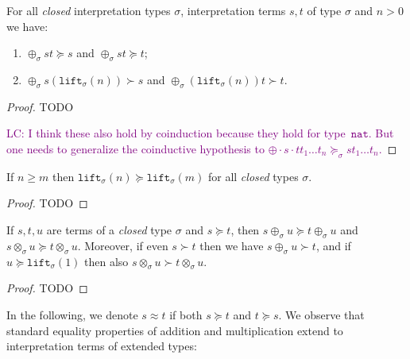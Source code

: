 \documentclass[runningheads,a4paper]{llncs}
\newcommand{\app}[2]{#1 \cdot #2}
\newcommand{\nat}{\mathtt{nat}}
\newcommand{\lift}{\mathtt{lift}}
\newcommand{\LC}[1]{\textcolor{purple}{LC: #1}}
\begin{document}
\begin{lemma}\label{lem:plusparts}
For all \emph{closed} interpretation types $\sigma$, interpretation
terms $s,t$ of type $\sigma$ and $n > 0$ we have:
\begin{enumerate}
\item $\oplus_{\sigma} s t \succeq s$ and
      $\oplus_{\sigma} s t \succeq t$;
\item $\oplus_{\sigma} s (\lift_{\sigma}(n)) \succ s$ and
      $\oplus_{\sigma} (\lift_{\sigma}(n)) t \succ t$.
\end{enumerate}
\end{lemma}

\begin{proof}
TODO

\LC{I think these also hold by coinduction because they hold for
  type~$\nat$. But one needs to generalize the coinductive hypothesis
  to $\app{\app{\oplus}{s}}{t} t_1 \ldots t_n \succeq_\sigma s t_1
  \ldots t_n$.}

\end{proof}

\begin{lemma}\label{lem:liftgreater}
If $n \geq m$ then $\lift_\sigma(n) \succeq \lift_\sigma(m)$ for all
\emph{closed} types $\sigma$.
\end{lemma}

\begin{proof}
TODO
\end{proof}

\begin{lemma}\label{lem:plustimesmonotonic}
If $s,t,u$ are terms of a \emph{closed} type $\sigma$ and $s \succeq
t$, then $s \oplus_\sigma u \succeq t \oplus_\sigma u$ and $s
\otimes_\sigma u \succeq t \otimes_\sigma u$.  Moreover, if even $s
\succ t$ then we have $s \oplus_\sigma u \succ t$, and if $u \succeq
\lift_\sigma(1)$ then also $s \otimes_\sigma u \succ t \otimes_\sigma
u$.
\end{lemma}

\begin{proof}
TODO
\end{proof}

In the following, we denote $s \approx t$ if both $s \succeq t$ and
$t \succeq s$.  We observe that standard equality properties of
addition and multiplication extend to interpretation terms of extended
types:
\end{document}
